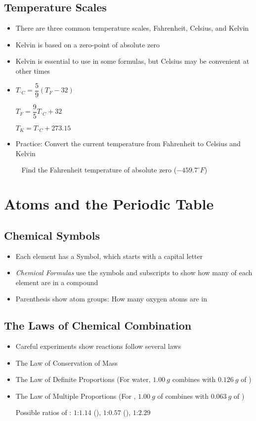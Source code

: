 \documentclass[12pt, openany, letterpaper]{memoir}
\begin{document}
\section{Temperature Scales}
\begin{itemize}
	\item There are three common temperature scales, Fahrenheit, Celsius, and Kelvin
	\item Kelvin is based on a zero-point of absolute zero
	\item Kelvin is essential to use in some formulas, but Celsius may be convenient at other times
	\item $T_{^\circ C}=\dfrac{5}{9}\left(T_F-32\right)$

	      $T_F=\dfrac{9}{5}T_{^\circ C}+32$

	      $T_K=T_{^\circ C}+273.15$

	\item Practice: Convert the current temperature from Fahrenheit to Celsius and Kelvin

	      ~\hphantom{Practice:} Find the Fahrenheit temperature of absolute zero ($-459.7^\circ F$)
\end{itemize}

\chapter{Atoms and the Periodic Table}
\section{Chemical Symbols}
\begin{itemize}
	\item Each element has a Symbol, which starts with a capital letter
	\item \emph{Chemical Formulas} use the symbols and subscripts to show how many of each element are in a compound
	\item Parenthesis show atom groups: How many oxygen atoms are in 
\end{itemize}
\section{The Laws of Chemical Combination}
\begin{itemize}
	\item Careful experiments show reactions follow several laws
	\item The Law of Conservation of Mass
	\item The Law of Definite Proportions (For water, $1.00~g$  combines with $0.126~g$ of )
	\item The Law of Multiple Proportions (For , $1.00~g$ of  combines with $0.063~g$ of )

	      Possible ratios of : $1$:$1.14$ (), $1$:$0.57$ (), $1$:$2.29$ 
\end{itemize}
\end{document}
